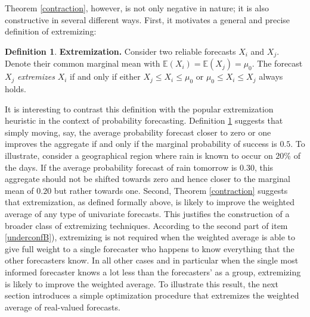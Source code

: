 \documentclass[11pt]{article}
\newcommand{\E}{\mathbb{E}}
\theoremstyle{definition}
\theoremstyle{definition}
\newtheorem{definition}[theorem]{Definition}
\def\E{{\mathbb E}}
\begin{document}

Theorem \ref{contraction}, however, is not only negative in nature; it is also  constructive in several different ways. First, 
it motivates a general and precise definition of extremizing:
\begin{definition} \label{extrem}
\textbf{Extremization.}
Consider two reliable forecasts $X_i$ and $X_j$. Denote their common marginal mean with $\E(X_i) = \E(X_j) = \mu_0$. The forecast $X_j$ \textit{extremizes} $X_i$ if and only if either $X_j \leq X_i \leq \mu_0$ or $\mu_0 \leq X_i \leq X_j $ always holds.
\end{definition}

\noindent
It is interesting to contrast this definition with the popular extremization heuristic in the context of probability forecasting.  Definition \ref{extrem} suggests that simply moving, say, the average probability forecast closer to zero or one improves the aggregate if and only if the marginal probability of success is $0.5$. To illustrate, consider a geographical region where rain is known to occur on $20$\% of the days. If the average probability forecast of rain tomorrow is $0.30$, this aggregate should not be shifted towards zero and hence closer to the marginal mean of $0.20$ but rather towards one. Second, Theorem \ref{contraction} suggests that extremization, as defined formally above, is likely to improve the weighted average of any type of univariate forecasts. This justifies the construction of a broader class of extremizing techniques. According to the second part of item \ref{underconfB}), extremizing is not required when the weighted average is able to give full weight to a single forecaster who happens to know everything that the other forecasters know. In all other cases and in particular when the single most informed forecaster knows a lot less than the forecasters' as a group, extremizing is likely to improve the weighted average. To illustrate this result, the next section introduces a simple optimization procedure that extremizes the weighted average of real-valued forecasts.
%
%
\end{document}

